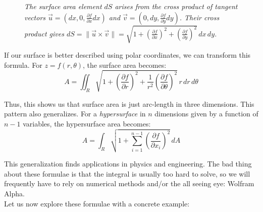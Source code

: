 \begin{figure}[H]
\caption{\textit{The surface area element $dS$ arises from the cross product of tangent vectors 
$\vec{u} = (dx, 0, \frac{\partial f}{\partial x}dx)$ and $\vec{v} = (0, dy, \frac{\partial f}{\partial y}dy)$. 
Their cross product gives $dS = \|\vec{u} \times \vec{v}\| = \sqrt{1 + \left(\frac{\partial f}{\partial x}\right)^2 + \left(\frac{\partial f}{\partial y}\right)^2}\,dx\,dy$.}}
\end{figure}


\noindent If our surface is better described using polar coordinates, we can transform this formula. For $z = f(r,\theta)$, the surface area becomes:
\[
A = \iint_R \sqrt{1 + \left(\frac{\partial f}{\partial r}\right)^2 + \frac{1}{r^2}\left(\frac{\partial f}{\partial \theta}\right)^2}\,r\,dr\,d\theta
\]

\noindent Thus, this shows us that surface area is just arc-length in three dimensions. This pattern also generalizes. For a \textit{hypersurface} in $n$ dimensions given by a function of $n-1$ variables, the hypersurface area becomes:
\[
A = \int_R \sqrt{1 + \sum_{i=1}^{n-1} \left(\frac{\partial f}{\partial x_i}\right)^2}\,dA
\]

\noindent This generalization finds applications in physics and engineering. The bad thing about these formulae is that the integral is usually too hard to solve, so we will frequently have to rely on numerical methods and/or the all seeing eye: Wolfram Alpha. \\

\noindent Let us now explore these formulae with a concrete example:

